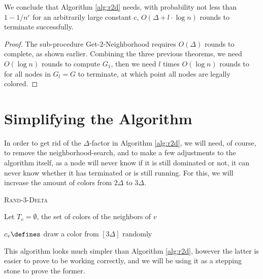 \begin{theorem}
\label{theorem:r2dkomplett}
	We conclude that Algorithm \ref{alg:r2d} needs, with probability not less than $1-1/n^c$ for an arbitrarily large constant c, $O(\Delta + l \cdot \log n)$ rounds to terminate successfully.
\end{theorem}
\begin{proof}
	The sub-procedure Get-$2$-Neighborhood requires $O(\Delta)$ rounds to complete, as shown earlier. Combining the three previous theorems, we need $O(\log n)$ rounds to compute $G_1$, then we need $l$ times $O(\log n)$ rounds to for all nodes in $G_l = G$ to terminate, at which point all nodes are legally colored. 
\end{proof}

\section{Simplifying the Algorithm}

In order to get rid of the $\Delta$-factor in Algorithm \ref{alg:r2d}, we will need, of course, to remove the neighborhood-search, and to make a few adjustments to the algorithm itself, as a node will never know if it is still dominated or not, it can never know whether it has terminated or is still running. For this, we will increase the amount of colors from $2\Delta$ to $3\Delta$.

\begin{algorithm}[ht]
\DontPrintSemicolon 
\caption{\textsc{Rand-3-Delta}}\label{alg:ir2d}

Let $T_v = \emptyset$, the set of colors of the neighbors of $v$\;

$c_v \defines$ draw a color from $[3\Delta]$ randomly\;



\end{algorithm}


This algorithm looks much simpler than Algorithm \ref{alg:r2d}, however the latter is easier to prove to be working correctly, and we will be using it as a stepping stone to prove the former.

